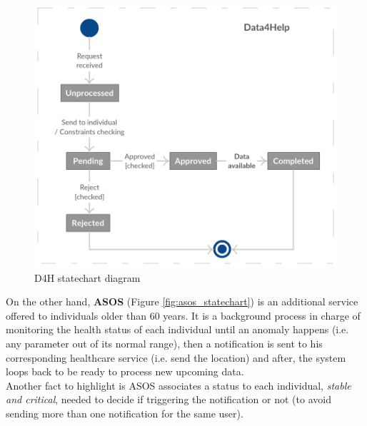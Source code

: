 \documentclass[hidelinks, 12pt]{report}
\begin{document}
 \begin{figure}[H]
\centering
 \includegraphics[scale=0.55]{Diagrams/d4h_statechart.png}
\caption[D4H statechart diagram]{D4H statechart diagram}
\label{fig:d4h_statechart}
\end{figure}

On the other hand, \textbf{ASOS} (Figure \ref{fig:asos_statechart}) is an additional service offered to individuals older than 60 years. It is a background process in charge of monitoring the health status of each individual until an anomaly happens (i.e. any parameter out of its normal range), then a notification is sent to his corresponding healthcare service (i.e. send the location) and after, the system loops back to be ready to process new upcoming data. \\

Another fact to highlight is ASOS associates a status to each individual, \textit{stable and critical}, needed to decide if triggering the notification or not (to avoid sending more than one notification for the same user). \\
\end{document}
